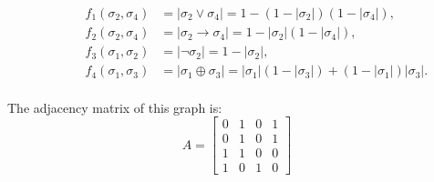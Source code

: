 \begin{figure}[h!]
\begin{subfigure}{0.3\textwidth}
\begin{flushright}
\end{flushright}

\end{subfigure}
\begin{subfigure}{0.7\textwidth}
\begin{align}
f_1(\sigma_2,\sigma_4) & = |\sigma_2 \lor \sigma_4| = 1-(1-|\sigma_2|)(1-|\sigma_4|),\\
f_2(\sigma_2,\sigma_4) & = |\sigma_2 \rightarrow \sigma_4| = 1-|\sigma_2|(1-|\sigma_4|),\\
f_3(\sigma_1,\sigma_2) & = |\lnot \sigma_2| = 1 - |\sigma_2|,\\
f_4(\sigma_1,\sigma_3) & = |\sigma_1 \oplus \sigma_3| = |\sigma_1|(1-|\sigma_3|)+(1-|\sigma_1|)|\sigma_3|.
\end{align}
\end{subfigure}
\end{figure}


\paragraph*{}
The adjacency matrix of this graph is:
\begin{equation}
A =
\begin{bmatrix}
0 & 1 & 0 & 1 \\
0 & 1 & 0 & 1 \\
1 & 1 & 0 & 0 \\
1 & 0 & 1 & 0
\end{bmatrix}
\end{equation}

